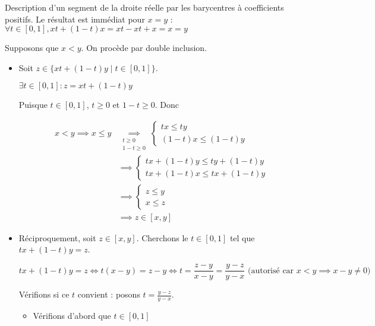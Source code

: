 \documentclass{article}
\renewenvironment{question_kholle}[2][ ]
{
	\subsection{\texorpdfstring{#2}{}}
	\notblank{#1}
	{
		\noindent #1
		\bigbreak
	}
	{}
	\begin{proof}
}
{
	\end{proof}
}
\begin{document}
\begin{question_kholle}[{
  Soient $(x, y) \in \R^2$ tels que $x \leqslant y$. $$[x, y] = \{z \in \R \mid x \leqslant z \leqslant y \} = \{tx + (1-t)y \mid t \in [0, 1]\}$$
  }]{Description d'un segment de la droite réelle par les barycentres à coefficients positifs.}
  Le résultat est immédiat pour $x = y$ : $\forall t \in [0, 1], xt+(1-t)x = xt - xt +x =x = y$
  
  Supposons que $x <y$. On procède par double inclusion.
  \begin{itemize}[label=$\star$]
    \item Soit $z \in \{ xt+(1-t)y \mid t \in [0, 1] \}$.
    
    $\exists t \in [0, 1] : z = xt+(1-t)y$
    
    Puisque $t \in [0, 1]$, $t \geqslant 0$ et $1-t \geqslant 0$.
    Donc
    
    \begin{align*}
      x < y \implies x\leqslant y &\underset{ \substack{t \geqslant 0 \\1-t \geqslant 0} }{ \implies } \left\{ \begin{array}{ll}
        tx \leqslant ty \\
        (1-t)x \leqslant (1-t)y 
      \end{array}\right. \\
      &\implies \left\{ \begin{array}{ll}
        tx + (1-t)y \leqslant ty + (1-t) y\\
        tx + (1-t)x  \leqslant tx + (1-t)y
      \end{array}\right. \\
      & \implies \left\{ \begin{array}{ll}
        z \leqslant y \\
        x \leqslant z 
      \end{array}\right. \\
      & \implies z \in[x, y]
    \end{align*}
    
    
    
    \item Réciproquement, soit $z \in[x, y]$. Cherchons le $t\in[0, 1]$ tel que $tx + (1-t)y = z$.
    
$$
    tx + (1-t)y = z \iff t(x-y) = z-y \iff t = \frac{z-y}{x-y} = \frac{y-z}{y-x} \text{ (autorisé car }x<y \implies x-y \neq 0 \text{)}
$$
    
    Vérifions si ce $t$ convient : posons $t = \frac{y-z}{y-x}$. 
    \begin{itemize}[label=$\bullet$]
      \item Vérifions d'abord que $t \in [0,1]$
      

\end{itemize}
\end{itemize}
\end{question_kholle}
\end{document}

